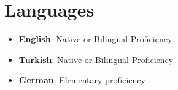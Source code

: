 \documentclass[letterpaper,11pt]{article}
\newcommand{\resumeItem}[1]{
  \item\small{
    {#1 \vspace{-2pt}}
  }
}
\newcommand{\resumeSkillExperience}[2]{
  \item \small{\textbf{#1}: #2} \vspace{-10pt}
}
\newcommand{\resumeLanguage}[2]{
  \item
    \textbf{#1}: #2 \vspace{-10pt}
}
\newcommand{\resumeSubHeadingListStart}{\begin{itemize}[leftmargin=0.0in, label={}]}
\newcommand{\resumeSubHeadingListEnd}{\end{itemize}}
\newcommand{\resumeItemListStart}{\begin{itemize}}
\begin{document}

\section{Languages}
  \resumeSubHeadingListStart
    \resumeLanguage
      {English}{Native or Bilingual Proficiency}
    \resumeLanguage
      {Turkish}{Native or Bilingual Proficiency}
    \resumeLanguage
      {German}{Elementary proficiency}
  \resumeSubHeadingListEnd
\vspace{-10pt}

            
\end{document}
